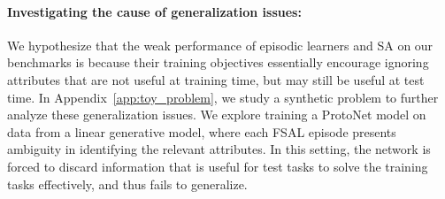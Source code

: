 \savespacebeforesection
\paragraph{Investigating the cause of generalization issues:} 
We hypothesize that the weak performance of episodic learners and SA on our
benchmarks is because their training objectives essentially encourage ignoring
attributes that are not useful at training time, but may still be useful at
test time. In Appendix~\ref{app:toy_problem}, we study a synthetic problem to
further analyze these generalization issues. We explore training a ProtoNet
model on data from a linear generative model, where each FSAL episode presents
ambiguity in identifying the relevant attributes. In this setting, the network
is forced to discard information that is useful for test tasks to solve the
training tasks effectively, and thus fails to generalize.

